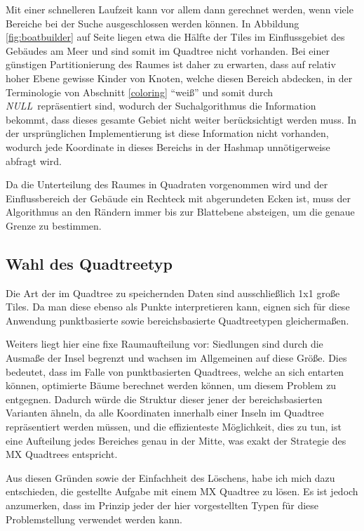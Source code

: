 \documentclass[%
			fontsize=12pt,%
			paper=a4,%
			DIV11,
			liststotoc,
			bibtotoc,
			draft=false,%
			titlepage
			]{scrartcl}
\newcommand{\mynull}{\textit{NULL}}
\begin{document}
Mit einer schnelleren Laufzeit kann vor allem dann gerechnet werden, wenn viele Bereiche bei der Suche ausgeschlossen werden können.
In Abbildung \ref{fig:boatbuilder} auf Seite \pageref{fig:boatbuilder} liegen etwa die Hälfte der Tiles im Einflussgebiet des Gebäudes am Meer und sind somit im Quadtree nicht vorhanden.
Bei einer günstigen Partitionierung des Raumes ist daher zu erwarten, dass auf relativ hoher Ebene gewisse Kinder von Knoten, welche diesen Bereich abdecken, in der Terminologie von Abschnitt \ref{coloring} "`weiß"' und somit durch \mynull\ repräsentiert sind, wodurch der Suchalgorithmus die Information bekommt, dass dieses gesamte Gebiet nicht weiter berücksichtigt werden muss.
In der ursprünglichen Implementierung ist diese Information nicht vorhanden, wodurch jede Koordinate in dieses Bereichs in der Hashmap unnötigerweise abfragt wird.

Da die Unterteilung des Raumes in Quadraten vorgenommen wird und der Einflussbereich der Gebäude ein Rechteck mit abgerundeten Ecken ist, 
muss der Algorithmus an den Rändern immer bis zur Blattebene absteigen, um die genaue Grenze zu bestimmen.

\subsection{Wahl des Quadtreetyp}

Die Art der im Quadtree zu speichernden Daten sind ausschließlich 1x1 große Tiles. Da man diese ebenso als Punkte interpretieren kann, eignen sich für diese Anwendung punktbasierte sowie bereichsbasierte Quadtreetypen gleichermaßen.

Weiters liegt hier eine fixe Raumaufteilung vor:
Siedlungen sind durch die Ausmaße der Insel begrenzt und wachsen im Allgemeinen auf diese Größe.
Dies bedeutet, dass im Falle von punktbasierten Quadtrees, welche an sich entarten können, optimierte Bäume berechnet werden können, um diesem Problem zu entgegnen.
Dadurch würde die Struktur dieser jener der bereichsbasierten Varianten ähneln, da alle Koordinaten innerhalb einer Inseln im Quadtree repräsentiert werden müssen, und die effizienteste Möglichkeit, dies zu tun, ist eine Aufteilung jedes Bereiches genau in der Mitte, was exakt der Strategie des MX Quadtrees entspricht.

Aus diesen Gründen sowie der Einfachheit des Löschens, habe ich mich dazu entschieden, die gestellte Aufgabe mit einem MX Quadtree zu lösen.
Es ist jedoch anzumerken, dass im Prinzip jeder der hier vorgestellten Typen für diese Problemstellung verwendet werden kann.
\end{document}

